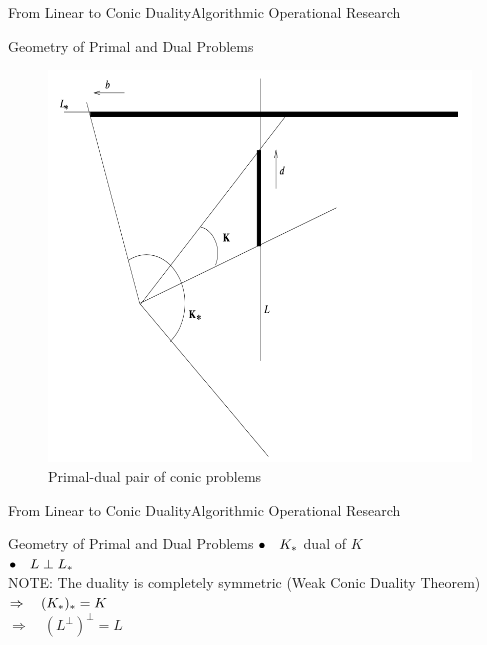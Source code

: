 \documentclass[11pt,aspectratio=169]{beamer}
\newcommand{\TT}{From Linear to Conic Duality}
\newcommand{\TL}{Algorithmic Operational Research}
\newcommand{\PII}{Geometry of Primal and Dual Problems}
\begin{document}
\begin{frame}{\TT}{\TL}
 \begin{block}{\PII}
\Large
\newline
\begin{figure}
\begin{center}
  \includegraphics[scale = 0.3]{fig1.png}
 
  \caption{Primal-dual pair of conic problems }
 \end{center}
\end{figure}
 \end{block}
\end{frame}

\begin{frame}{\TT}{\TL}
 \begin{block}{\PII}
\Large
\newline
\vspace{2mm}
  \hspace{2mm} $\bullet \quad K_{\**}$ dual of $K$ \\
  \hspace{2mm} $\bullet \quad L\perp L_{\**}$ \newline \\
  NOTE: The duality is completely symmetric (Weak Conic Duality Theorem) \\ \vspace{2mm}
 \hspace{2mm} $\Rightarrow \quad (K_{\**})_{\**} = K$ \\
 \hspace{2mm} $\Rightarrow \quad (L^{\perp})^{\perp} = L$
 \end{block}
\end{frame}
\end{document}
